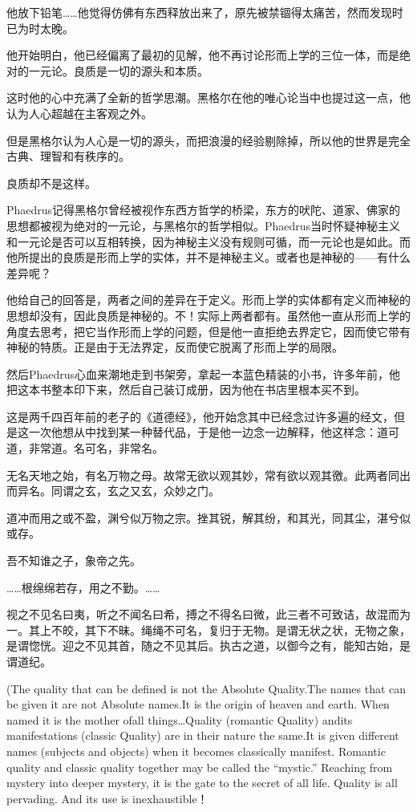 \documentclass[UTF8]{article}
\begin{document}
\par 他放下铅笔……他觉得仿佛有东西释放出来了，原先被禁锢得太痛苦，然而发现时已为时太晚。
\par 他开始明白，他已经偏离了最初的见解，他不再讨论形而上学的三位一体，而是绝对的一元论。良质是一切的源头和本质。
\par 这时他的心中充满了全新的哲学思潮。黑格尔在他的唯心论当中也提过这一点，他认为人心超越在主客观之外。
\par 但是黑格尔认为人心是一切的源头，而把浪漫的经验剔除掉，所以他的世界是完全古典、理智和有秩序的。
\par 良质却不是这样。
\par Phaedrus记得黑格尔曾经被视作东西方哲学的桥梁，东方的吠陀、道家、佛家的思想都被视为绝对的一元论，与黑格尔的哲学相似。Phaedrus当时怀疑神秘主义和一元论是否可以互相转换，因为神秘主义没有规则可循，而一元论也是如此。而他所提出的良质是形而上学的实体，并不是神秘主义。或者也是神秘的——有什么差异呢？
\par 他给自己的回答是，两者之间的差异在于定义。形而上学的实体都有定义而神秘的思想却没有，因此良质是神秘的。不！实际上两者都有。虽然他一直从形而上学的角度去思考，把它当作形而上学的问题，但是他一直拒绝去界定它，因而使它带有神秘的特质。正是由于无法界定，反而使它脱离了形而上学的局限。
\par 然后Phaedrus心血来潮地走到书架旁，拿起一本蓝色精装的小书，许多年前，他把这本书整本印下来，然后自己装订成册，因为他在书店里根本买不到。
\par 这是两千四百年前的老子的《道德经》，他开始念其中已经念过许多遍的经文，但是这一次他想从中找到某一种替代品，于是他一边念一边解释，他这样念：道可道，非常道。名可名，非常名。
\par 无名天地之始，有名万物之母。故常无欲以观其妙，常有欲以观其徼。此两者同出而异名。同谓之玄，玄之又玄，众妙之门。
\par 道冲而用之或不盈，渊兮似万物之宗。挫其锐，解其纷，和其光，同其尘，湛兮似或存。
\par 吾不知谁之子，象帝之先。
\par ……根绵绵若存，用之不勤。……
\par 视之不见名曰夷，听之不闻名曰希，搏之不得名曰微，此三者不可致诘，故混而为一。其上不皎，其下不昧。绳绳不可名，复归于无物。是谓无状之状，无物之象，是谓惚恍。迎之不见其首，随之不见其后。执古之道，以御今之有，能知古始，是谓道纪。
\par (The quality that can be defined is not the Absolute Quality.The names that can be given it are not Absolute names.It is the origin of heaven and earth. When named it is the mother ofall things…Quality (romantic Quality) andits manifestations (classic Quality) are in their nature the same.It is given different names (subjects and objects) when it becomes classically manifest. Romantic quality and classic quality together may be called the “mystic.” Reaching from mystery into deeper mystery, it is the gate to the secret of all life. Quality is all pervading. And its use is inexhaustible！
\end{document}
